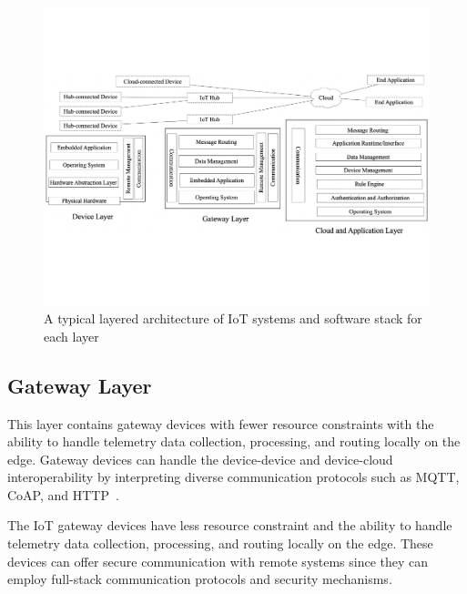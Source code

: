  \begin{figure}[t]
  \centering 
   \includegraphics[width=\linewidth]{./imgs/arch1.pdf}
  \caption{A typical layered architecture of IoT systems and software stack for each layer}
  \label{fig:arch}
\end{figure}

\subsection{Gateway Layer}
This layer contains gateway devices with fewer resource constraints with the ability to handle telemetry data collection, processing, and routing locally on the edge. Gateway devices can handle the device-device and device-cloud interoperability by interpreting diverse communication protocols such as MQTT, CoAP, and HTTP~\cite{tschofenig2014architectural}. 

The IoT gateway devices have less resource constraint and the ability to handle telemetry data collection, processing, and routing locally on the edge. These devices can offer secure communication with remote systems since they can employ full-stack communication protocols and security mechanisms\cite{bormann2014terminology}.

